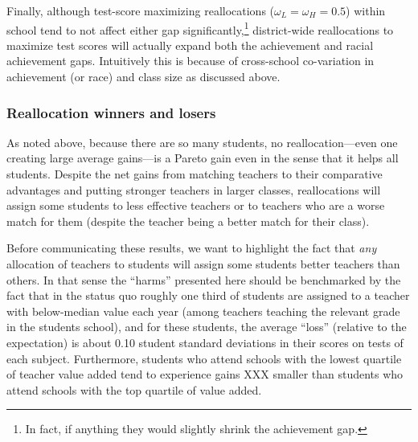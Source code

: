 \documentclass[12pt]{article}
\theoremstyle{definition}
\theoremstyle{definition}
\theoremstyle{definition}
\theoremstyle{definition}
\begin{document}
Finally, although test-score maximizing reallocations ($\omega_L=\omega_H=0.5$) within school tend to not affect either gap significantly,\footnote{In fact, if anything they would slightly shrink the achievement gap.} district-wide reallocations to maximize test scores will actually expand both the achievement and racial achievement gaps. Intuitively this is because of cross-school co-variation in achievement (or race) and class size as discussed above.


\subsubsection{Reallocation winners and losers}

As noted above, because there are so many students, no reallocation---even one creating large average gains---is a Pareto gain even in the sense that it helps all students. Despite the net gains from matching teachers to their comparative advantages and putting stronger teachers in larger classes, reallocations will assign some students to less effective teachers or to teachers who are a worse match for them (despite the teacher being a better match for their class). 

Before communicating these results, we want to highlight the fact that \textit{any} allocation of teachers to students will assign some students better teachers than others. In that sense the ``harms'' presented here should be benchmarked by the fact that in the status quo roughly one third of students are assigned to a teacher with below-median value each year (among teachers teaching the relevant grade in the students school), and for these students, the average ``loss'' (relative to the expectation) is about 0.10 student standard deviations in their scores on tests of each subject. Furthermore, students who attend schools with the lowest quartile of teacher value added tend to experience gains XXX smaller than students who attend schools with the top quartile of value added.
\end{document}
